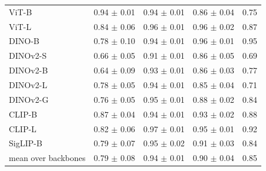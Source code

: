 \begin{table}[H]
\begin{tabular}{lccc|c}
ViT-B & 0.94 $\pm$ 0.01 & 0.94 $\pm$ 0.01 & 0.86 $\pm$ 0.04 & 0.75 \\
ViT-L & 0.84 $\pm$ 0.06 & 0.96 $\pm$ 0.01 & 0.96 $\pm$ 0.02 & 0.87 \\
\midrule
DINO-B & 0.78 $\pm$ 0.10 & 0.94 $\pm$ 0.01 & 0.96 $\pm$ 0.01 & 0.95 \\
DINOv2-S & 0.66 $\pm$ 0.05 & 0.91 $\pm$ 0.01 & 0.86 $\pm$ 0.05 & 0.69 \\
DINOv2-B & 0.64 $\pm$ 0.09 & 0.93 $\pm$ 0.01 & 0.86 $\pm$ 0.03 & 0.77 \\
DINOv2-L & 0.78 $\pm$ 0.05 & 0.94 $\pm$ 0.01 & 0.85 $\pm$ 0.04 & 0.71 \\
DINOv2-G & 0.76 $\pm$ 0.05 & 0.95 $\pm$ 0.01 & 0.88 $\pm$ 0.02 & 0.84 \\
\midrule
CLIP-B & 0.87 $\pm$ 0.04 & 0.94 $\pm$ 0.01 & 0.93 $\pm$ 0.02 & 0.88 \\
CLIP-L & 0.82 $\pm$ 0.06 & 0.97 $\pm$ 0.01 & 0.95 $\pm$ 0.01 & 0.92 \\
SigLIP-B & 0.79 $\pm$ 0.07 & 0.95 $\pm$ 0.02 & 0.91 $\pm$ 0.03 & 0.84 \\
\midrule
mean over backbones & 0.79 $\pm$ 0.08 & 0.94 $\pm$ 0.01 & 0.90 $\pm$ 0.04 & 0.85 \\
\bottomrule
\end{tabular}
\par\vspace{5pt}
\endgroup

\end{table}
